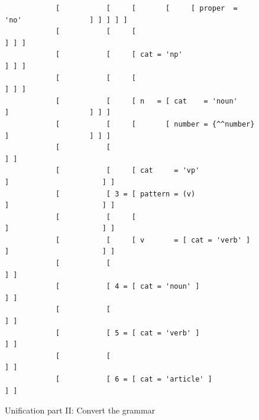 \documentclass[12pt]{article}
\begin{document}
{\begin{figure}[h!]
{\begin{verbatim}
            [           [     [       [     [ proper  = 'no'                ] ] ] ] ]
            [           [     [                                                 ] ] ]
            [           [     [ cat = 'np'                                      ] ] ]
            [           [     [                                                 ] ] ]
            [           [     [ n   = [ cat    = 'noun'     ]                   ] ] ]
            [           [     [       [ number = {^^number} ]                   ] ] ]
            [           [                                                         ] ]
            [           [     [ cat     = 'vp'             ]                      ] ]
            [           [ 3 = [ pattern = (v)              ]                      ] ]
            [           [     [                            ]                      ] ]
            [           [     [ v       = [ cat = 'verb' ] ]                      ] ]
            [           [                                                         ] ]
            [           [ 4 = [ cat = 'noun' ]                                    ] ]
            [           [                                                         ] ]
            [           [ 5 = [ cat = 'verb' ]                                    ] ]
            [           [                                                         ] ]
            [           [ 6 = [ cat = 'article' ]                                 ] ]
\end{verbatim}
}
\caption{Unification part II: Convert the grammar}
\label{fig:unification-two}
\end{figure}

}
\end{document}
